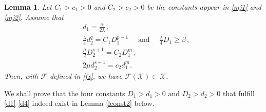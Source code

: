 \documentclass[leqno,12pt]{article}
\newtheorem{lemma}[theorem]{Lemma}
\numberwithin{equation}{section}
\begin{document}
\begin{lemma}\label{lconst1}
Let $C_1>c_1>0$ and $C_2>c_2>0$ be the constants appear in  \eqref{mj1} and \eqref{mj2}. 
Assume that 
\begin{subequations}
\begin{align}
& d_1  =\frac{\alpha}{2\lambda} \, , \label{d1}\\
& \frac{\lambda}{4} d_2^{q} = C_1 D_1^{p-1}  \quad\mbox{ and }\quad \frac{\lambda}{4} D_1\geq \beta \, , \label{d2} \\[0.07in]
& \frac{\mu}{2} D_2^{s+1}=C_2 D_1^m\, , \label{d3}\\[0.04in]
& 2\mu d_2^{s+1}  = c_2 d_1^m. \label{d4}
\end{align}
\end{subequations}
Then, with $\mathscr{F}$ defined in \eqref{fx}, we have  $\mathscr{F}(\mathscr{X})\subset \mathscr{X}$.
\end{lemma}
We shall prove that the four constants $D_1>d_1>0$ and $D_2>d_2>0$ that fulfill \eqref{d1}-\eqref{d4} indeed exist in Lemma \ref{lconst2} below. 
\end{document}
